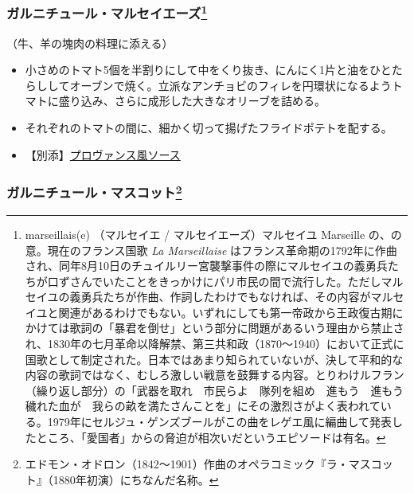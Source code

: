 \begin{recette}
{\subsubsection[ガルニチュール・マルセイエーズ]{\texorpdfstring{ガルニチュール・マルセイエーズ\footnote{marseillais(e)
  （マルセイエ / マルセイエーズ）マルセイユ Marseille
  の、の意。現在のフランス国歌 \emph{La Marseillaise}
  はフランス革命期の1792年に作曲され、同年8月10日のチュイルリー宮襲撃事件の際にマルセイユの義勇兵たちが口ずさんでいたことをきっかけにパリ市民の間で流行した。ただしマルセイユの義勇兵たちが作曲、作詞したわけでもなければ、その内容がマルセイユと関連があるわけでもない。いずれにしても第一帝政から王政復古期にかけては歌詞の「暴君を倒せ」という部分に問題があるいう理由から禁止され、1830年の七月革命以降解禁、第三共和政（1870〜1940）において正式に国歌として制定された。日本ではあまり知られていないが、決して平和的な内容の歌詞ではなく、むしろ激しい戦意を鼓舞する内容。とりわけルフラン（繰り返し部分）の「武器を取れ　市民らよ　隊列を組め　進もう　進もう　穢れた血が　我らの畝を満たさんことを」にその激烈さがよく表われている。1979年にセルジュ・ゲンズブールがこの曲をレゲエ風に編曲して発表したところ、「愛国者」からの脅迫が相次いだというエピソードは有名。}}{ガルニチュール・マルセイエーズ}}\label{garniture-marseillaise}}



（牛、羊の塊肉の料理に添える）

\begin{itemize}
\item
  小さめのトマト5個を半割りにして中をくり抜き、にんにく1片と油をひとたらししてオーブンで焼く。立派なアンチョビのフィレを円環状になるようトマトに盛り込み、さらに成形した大きなオリーブを詰める。
\item
  それぞれのトマトの間に、細かく切って揚げたフライドポテトを配する。
\item
  【別添】\protect\hyperlink{sauce-provencale}{プロヴァンス風ソース}
\end{itemize}

\atoaki{}

\hypertarget{garniture-mascotte}{%
\subsubsection[ガルニチュール・マスコット]{\texorpdfstring{ガルニチュール・マスコット\footnote{エドモン・オドロン（1842〜1901）作曲のオペラコミック『ラ・マスコット』（1880年初演）にちなんだ名称。}}{ガルニチュール・マスコット}}\label{garniture-mascotte}}


\end{recette}
